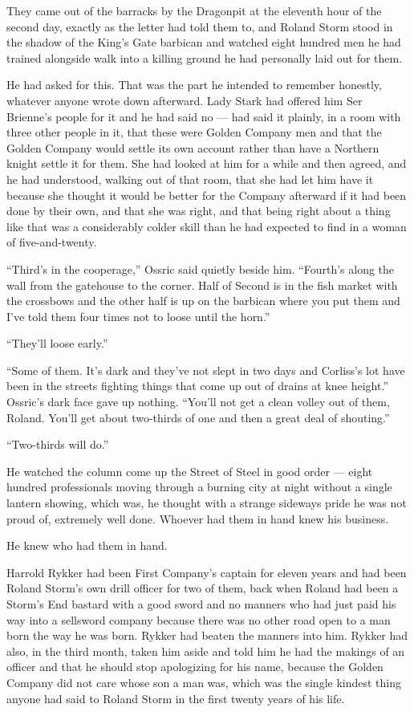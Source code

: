 They came out of the barracks by the Dragonpit at the eleventh hour of the second day, exactly as the letter had told them to, and Roland Storm stood in the shadow of the King’s Gate barbican and watched eight hundred men he had trained alongside walk into a killing ground he had personally laid out for them.

He had asked for this. That was the part he intended to remember honestly, whatever anyone wrote down afterward. Lady Stark had offered him Ser Brienne’s people for it and he had said no — had said it plainly, in a room with three other people in it, that these were Golden Company men and that the Golden Company would settle its own account rather than have a Northern knight settle it for them. She had looked at him for a while and then agreed, and he had understood, walking out of that room, that she had let him have it because she thought it would be better for the Company afterward if it had been done by their own, and that she was right, and that being right about a thing like that was a considerably colder skill than he had expected to find in a woman of five-and-twenty.

“Third’s in the cooperage,” Ossric said quietly beside him. “Fourth’s along the wall from the gatehouse to the corner. Half of Second is in the fish market with the crossbows and the other half is up on the barbican where you put them and I’ve told them four times not to loose until the horn.”

“They’ll loose early.”

“Some of them. It’s dark and they’ve not slept in two days and Corliss’s lot have been in the streets fighting things that come up out of drains at knee height.” Ossric’s dark face gave up nothing. “You’ll not get a clean volley out of them, Roland. You’ll get about two-thirds of one and then a great deal of shouting.”

“Two-thirds will do.”

He watched the column come up the Street of Steel in good order — eight hundred professionals moving through a burning city at night without a single lantern showing, which was, he thought with a strange sideways pride he was not proud of, extremely well done. Whoever had them in hand knew his business.

He knew who had them in hand.

\sceneBreak

Harrold Rykker had been First Company’s captain for eleven years and had been Roland Storm’s own drill officer for two of them, back when Roland had been a Storm’s End bastard with a good sword and no manners who had just paid his way into a sellsword company because there was no other road open to a man born the way he was born. Rykker had beaten the manners into him. Rykker had also, in the third month, taken him aside and told him he had the makings of an officer and that he should stop apologizing for his name, because the Golden Company did not care whose son a man was, which was the single kindest thing anyone had said to Roland Storm in the first twenty years of his life.


